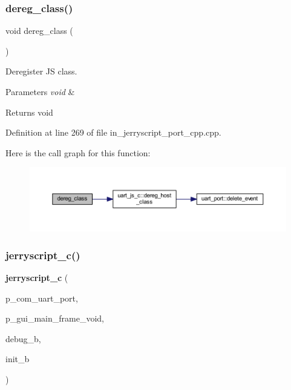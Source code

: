 \subsubsection{dereg\_class()}
{\footnotesize\ttfamily void dereg\+\_\+class (\begin{DoxyParamCaption}\item[{void}]{ }\end{DoxyParamCaption})}



Deregister JS class. 


\begin{DoxyParams}{Parameters}
{\em void} & \\
\hline
\end{DoxyParams}
\begin{DoxyReturn}{Returns}
void 
\end{DoxyReturn}


Definition at line 269 of file in\+\_\+jerryscript\+\_\+port\+\_\+cpp.\+cpp.

Here is the call graph for this function\+:\nopagebreak
\begin{figure}[H]
\begin{center}
\leavevmode
\includegraphics[width=350pt]{group___port_ga028c4a3d2af780017a3fb63a77e05adc_cgraph}
\end{center}
\end{figure}
\mbox{\label{group___port_gac10ddd7d22dafbfb416ef945372b9a17}} 
\subsubsection{jerryscript\_c()}
{\footnotesize\ttfamily \textbf{ jerryscript\+\_\+c} (\begin{DoxyParamCaption}\item[{\textbf{ uart\+\_\+port} $\ast$}]{p\+\_\+com\+\_\+uart\+\_\+port,  }\item[{void $\ast$}]{p\+\_\+gui\+\_\+main\+\_\+frame\+\_\+void,  }\item[{bool}]{debug\+\_\+b,  }\item[{bool}]{init\+\_\+b }\end{DoxyParamCaption})}



